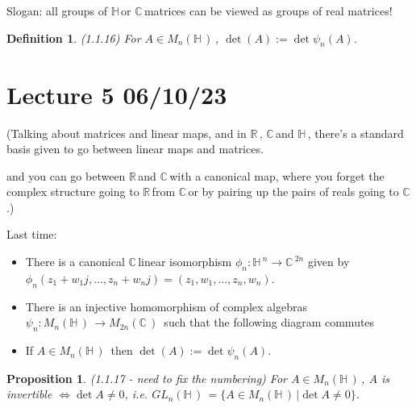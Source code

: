 \documentclass[12pt,a4paper]{article}
\newcommand{\rR}{\ensuremath{\mathbb{R}\,}}
\newcommand{\cC}{\ensuremath{\mathbb{C}\,}}
\newcommand{\hH}{\ensuremath{\mathbb{H}\,}}
\newcommand{\mnh}{\ensuremath{M_n(\hH)\,}}
\newcommand{\mc}[1]{\ensuremath{M_{#1}(\cC)\,}}
\newcommand{\glnh}{\ensuremath{GL_n(\hH)\,}}
\newtheorem{defn}[thm]{Definition}
\newtheorem{prop}[thm]{Proposition}
\begin{document}
Slogan: all groups of \hH or \cC matrices can be viewed as groups of real matrices!

\begin{defn}
(1.1.16) For $A\in \mnh$, $\det(A):=\det \psi_n(A)$.
\end{defn}

\section{Lecture 5 06/10/23}

(Talking about matrices and linear maps, and in \rR , \cC and \hH, there's a standard basis given to go between linear maps and matrices.

\begin{center}
\end{center}
and you can go between \rR and \cC with a canonical map, where you forget the complex structure going to \rR from \cC or by pairing up the pairs of reals going to \cC .)

Last time:

\begin{itemize}
\item There is a canonical \cC linear isomorphism $\phi_n:\hH^n\to \cC^{2n}$ given by $\phi_n(z_1+w_1 j, \ldots, z_n+w_n j)=(z_1,w_1,\ldots,z_n, w_n).$
\item There is an injective homomorphism of complex algebras $\psi_n: \mnh \to \mc{2n}$ such that the following diagram commutes
\begin{center}
\end{center}
\item If $A\in \mnh$ then $\det(A):=\det \psi_n(A)$.
\end{itemize}

\begin{prop}
(1.1.17 - need to fix the numbering) For $A\in \mnh$, $A$ is invertible $\iff \det A \neq 0$, i.e. $\glnh=\{A\in \mnh | \det A \neq 0\}$.
\end{prop}
\end{document}

